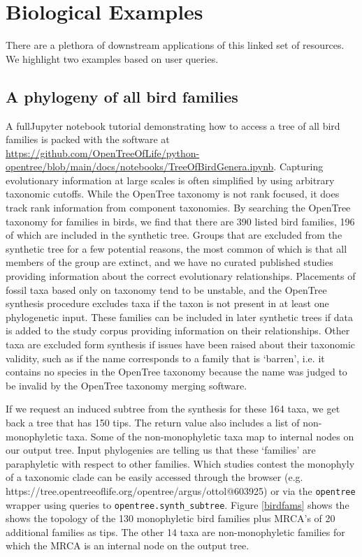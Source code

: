 \documentclass[oupdraft]{sysbio_sse}
\begin{document}
\bigskip

\section{Biological Examples}
\label{sec4}

There are a plethora of downstream applications of this linked set of resources.
We highlight two examples based on user queries.


\subsection{A phylogeny of all bird families}
A fullJupyter notebook tutorial demonstrating how to access a tree of all bird families is packed with the software at \url{https://github.com/OpenTreeOfLife/python-opentree/blob/main/docs/notebooks/TreeOfBirdGenera.ipynb}.
Capturing evolutionary information at large scales is often simplified by using arbitrary taxonomic cutoffs.
While the OpenTree taxonomy is not rank focused, it does track rank information from component taxonomies.
By searching the OpenTree taxonomy for families in birds, we find that there are 390 listed bird families, 196 of which are included in the synthetic tree.
Groups that are excluded from the synthetic tree for a few potential reasons, the most common of which is that all members of the group are extinct, and we have no curated published studies providing information about the correct evolutionary relationships.
Placements of fossil taxa based only on taxonomy tend to be unstable, and the OpenTree synthesis procedure excludes taxa if the taxon is not present in at least one  phylogenetic input.
These families can be included in later synthetic trees if data is added to the study corpus providing information on their relationships.
Other taxa are excluded form synthesis if issues have been raised about their taxonomic validity, such as if the name corresponds to a family that is `barren', i.e. it contains no species in the OpenTree taxonomy because the name was judged to be invalid by the OpenTree taxonomy merging software\citep{rees_automated_2017}.

If we request an induced subtree from the synthesis for these 164 taxa, we get back a tree that has 150 tips. The return value also includes a list of non-monophyletic taxa.
Some of the non-monophyletic taxa map to internal nodes on our output tree. Input phylogenies are telling us that these `families' are paraphyletic with respect to other families. Which studies contest the monophyly of a taxonomic clade can be easily accessed through the browser (e.g. https://tree.opentreeoflife.org/opentree/argus/ottol@603925) or via the \texttt{opentree} wrapper using queries to \texttt{opentree.synth\_subtree}. Figure \ref{birdfams} shows the shows the topology of the 130 monophyletic bird families plus MRCA's of 20 additional families as tips. The other 14 taxa are non-monophyletic families for which the MRCA is an internal node on the output tree.
\end{document}
